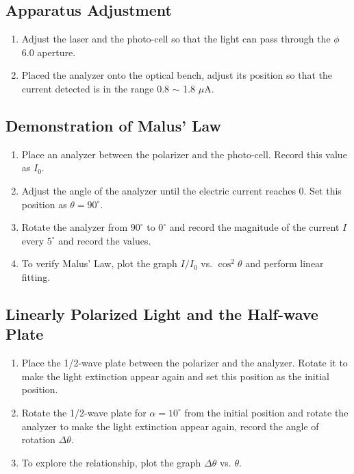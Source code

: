 \documentclass{article}
\begin{document}
\subsection{Apparatus Adjustment}
\begin{enumerate}
\item Adjust the laser and the photo-cell so that the light can pass through the $\phi$ 6.0 aperture.
\item Placed the analyzer onto the optical bench, adjust its position so that the current detected is in the range 0.8 $\sim$ 1.8 $\mu$A.
\end{enumerate}

\subsection{Demonstration of Malus' Law}
\begin{enumerate}
\item Place an analyzer between the polarizer and the photo-cell. Record this value as $I_0$.
\item Adjust the angle of the analyzer until the electric current reaches 0. Set this position as $\theta = 90^\circ$.
\item Rotate the analyzer from $90^\circ$ to $0^\circ$ and record the magnitude of the current $I$ every $5^\circ$ and record the values.
\item To verify Malus' Law, plot the graph $I/I_0$ vs. $\cos^2\theta$ and perform linear fitting.
\end{enumerate}

\subsection{Linearly Polarized Light and the Half-wave Plate}
\begin{enumerate}
\item Place the 1/2-wave plate between the polarizer and the analyzer. Rotate it to make the light extinction appear again and set this position as the initial position.
\item Rotate the 1/2-wave plate for $\alpha = 10^\circ$ from the initial position and rotate the analyzer to make the light extinction appear again, record the angle of rotation $\Delta\theta$.
\item To explore the relationship, plot the graph $\Delta\theta$ vs. $\theta$.
\end{enumerate}
\end{document}
